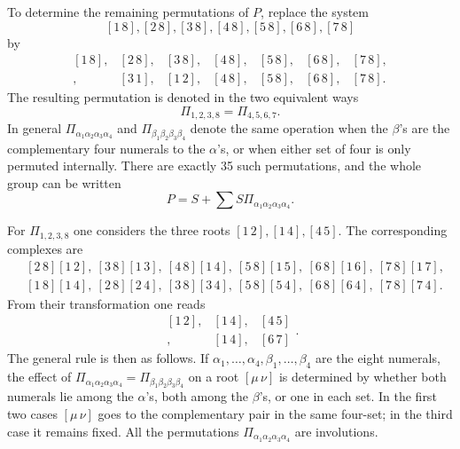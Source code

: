 \documentclass[11pt]{article}
\providecommand{\pair}[2]{[#1\,#2]}
\begin{document}
To determine the remaining permutations of \(P\), replace the system
\[
 \pair{1}{8},\pair{2}{8},\pair{3}{8},\pair{4}{8},\pair{5}{8},\pair{6}{8},\pair{7}{8}
\]
by
\begin{equation}
\begin{array}{rrrrrrr}
\pair{1}{8},&\pair{2}{8},&\pair{3}{8},&\pair{4}{8},&\pair{5}{8},&\pair{6}{8},&\pair{7}{8},\\
\pair{2}{3},&\pair{3}{1},&\pair{1}{2},&\pair{4}{8},&\pair{5}{8},&\pair{6}{8},&\pair{7}{8}.
\end{array} \tag{2}
\end{equation}
The resulting permutation is denoted in the two equivalent ways
\begin{equation}
 \Pi_{1,2,3,8}=\Pi_{4,5,6,7}. \tag{3}
\end{equation}
In general \(\Pi_{\alpha_1\alpha_2\alpha_3\alpha_4}\) and \(\Pi_{\beta_1\beta_2\beta_3\beta_4}\) denote the same operation when the \(\beta\)'s are the complementary four numerals to the \(\alpha\)'s, or when either set of four is only permuted internally. There are exactly 35 such permutations, and the whole group can be written
\begin{equation}
 P=S+\sum S\Pi_{\alpha_1\alpha_2\alpha_3\alpha_4}. \tag{4}
\end{equation}

For \(\Pi_{1,2,3,8}\) one considers the three roots \(\pair{1}{2},\pair{1}{4},\pair{4}{5}\). The corresponding complexes are
\begin{align}
&\pair{2}{8}\pair{1}{2},\ \pair{3}{8}\pair{1}{3},\ \pair{4}{8}\pair{1}{4},\ \pair{5}{8}\pair{1}{5},\ \pair{6}{8}\pair{1}{6},\ \pair{7}{8}\pair{1}{7}, \tag{5}\\
&\pair{1}{8}\pair{1}{4},\ \pair{2}{8}\pair{2}{4},\ \pair{3}{8}\pair{3}{4},\ \pair{5}{8}\pair{5}{4},\ \pair{6}{8}\pair{6}{4},\ \pair{7}{8}\pair{7}{4}. \tag{6}
\end{align}
From their transformation one reads
\begin{equation}
 \begin{array}{ccc}
 \pair{1}{2},&\pair{1}{4},&\pair{4}{5}\\
 \pair{3}{8},&\pair{1}{4},&\pair{6}{7}
 \end{array}. \tag{7}
\end{equation}
The general rule is then as follows. If \(\alpha_1,
\ldots,
\alpha_4,\beta_1,
\ldots,
\beta_4\) are the eight numerals, the effect of \(\Pi_{\alpha_1\alpha_2\alpha_3\alpha_4}=\Pi_{\beta_1\beta_2\beta_3\beta_4}\) on a root \(\pair{\mu}{\nu}\) is determined by whether both numerals lie among the \(\alpha\)'s, both among the \(\beta\)'s, or one in each set. In the first two cases \(\pair{\mu}{\nu}\) goes to the complementary pair in the same four-set; in the third case it remains fixed. All the permutations \(\Pi_{\alpha_1\alpha_2\alpha_3\alpha_4}\) are involutions.
\end{document}
